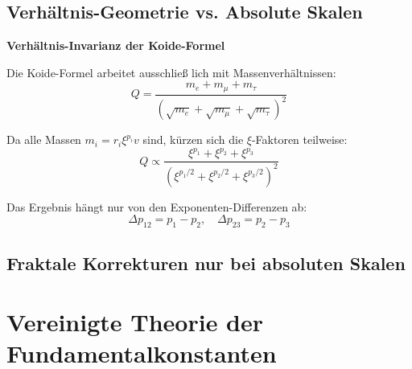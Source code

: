 	\subsection{Verhältnis-Geometrie vs. Absolute Skalen}
	
	\begin{theorem}
		\textbf{Verhältnis-Invarianz der Koide-Formel}
		
		Die Koide-Formel arbeitet ausschließ lich mit Massenverhältnissen:
		\begin{equation}
			Q = \frac{m_e + m_\mu + m_\tau}{(\sqrt{m_e} + \sqrt{m_\mu} + \sqrt{m_\tau})^2}
		\end{equation}
		
		Da alle Massen $m_i = r_i \xi^{p_i} v$ sind, kürzen sich die $\xi$-Faktoren teilweise:
		\begin{equation}
			Q \propto \frac{\xi^{p_1} + \xi^{p_2} + \xi^{p_3}}{(\xi^{p_1/2} + \xi^{p_2/2} + \xi^{p_3/2})^2}
		\end{equation}
		
		Das Ergebnis hängt nur von den Exponenten-Differenzen ab:
		\begin{equation}
			\Delta p_{12} = p_1 - p_2, \quad \Delta p_{23} = p_2 - p_3
		\end{equation}
	\end{theorem}
	
	\subsection{Fraktale Korrekturen nur bei absoluten Skalen}
	
	\begin{table}[h]
		\centering
		\caption{Notwendigkeit fraktaler Korrekturen}
	\end{table}
	
	\section{Vereinigte Theorie der Fundamentalkonstanten}
	
